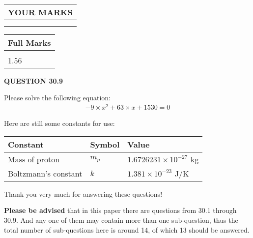 \documentclass[12pt]{article}
\begin{document}
 

 
\vspace{0.3in}
  
\vspace{0.2in}
  
\noindent\begin{tabular}{|l|}
\hline
 YOUR MARKS  \\
\hline
 \\ 
 \\ 
\hline
\end{tabular}
\hspace{0.05in} \begin{tabular}{|l|}
\hline
 Full Marks  \\
\hline
 \\ 
1.56 \\
\hline
\end{tabular}
{\textbf{\Large{QUESTION
30.9 
}}}
  
  
 
 

 
Please solve the following equation:
\begin{eqnarray*}
-9 \times x^2  %
+  %
63
                 \times x    %
+  %
1530 =0
\end{eqnarray*}
 

 

 
\vspace{0.3in}
   
   
 \vspace{0.2in}
Here are still some constants for use:
 
 
\noindent\begin{tabular}{|l|l|l|}
\hline
Constant & Symbol & Value \\
\hline
 
Mass of proton &
$m_p$ &
 $ 1.6726231 \times 10^{-27} $
kg \\
\hline
 
Boltzmann's constant &
$k$ &
 $ 1.381 \times 10^{-23} $
J/K \\
\hline
 
\end{tabular}
 
Thank you very much for answering these questions!
 
{\textbf{\large{Please be advised}}} that in this paper there are questions from
30.1 through
30.9.
And any one of them may contain more than one sub-question, thus the total number
of sub-questions here is around 14, of which
13 should be answered.
 
\end{document}
